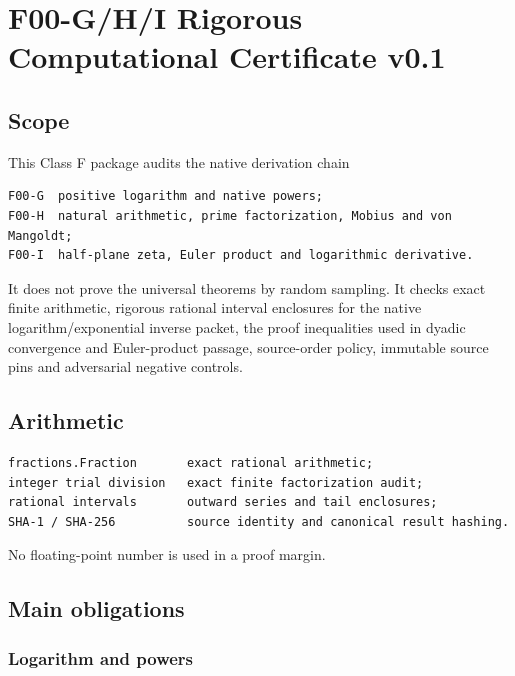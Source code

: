 \hypertarget{f00-ghi-rigorous-computational-certificate-v0.1}{%
\chapter{F00-G/H/I Rigorous Computational Certificate v0.1}\label{f00-ghi-rigorous-computational-certificate-v0.1}}

\hypertarget{scope}{%
\section{Scope}\label{scope}}

This Class F package audits the native derivation chain

\begin{verbatim}
F00-G  positive logarithm and native powers;
F00-H  natural arithmetic, prime factorization, Mobius and von Mangoldt;
F00-I  half-plane zeta, Euler product and logarithmic derivative.
\end{verbatim}

It does not prove the universal theorems by random sampling. It checks exact finite arithmetic, rigorous rational interval enclosures for the native logarithm/exponential inverse packet, the proof inequalities used in dyadic convergence and Euler-product passage, source-order policy, immutable source pins and adversarial negative controls.

\hypertarget{arithmetic}{%
\section{Arithmetic}\label{arithmetic}}

\begin{verbatim}
fractions.Fraction       exact rational arithmetic;
integer trial division   exact finite factorization audit;
rational intervals       outward series and tail enclosures;
SHA-1 / SHA-256          source identity and canonical result hashing.
\end{verbatim}

No floating-point number is used in a proof margin.

\hypertarget{main-obligations}{%
\section{Main obligations}\label{main-obligations}}

\hypertarget{logarithm-and-powers}{%
\subsection{Logarithm and powers}\label{logarithm-and-powers}}

